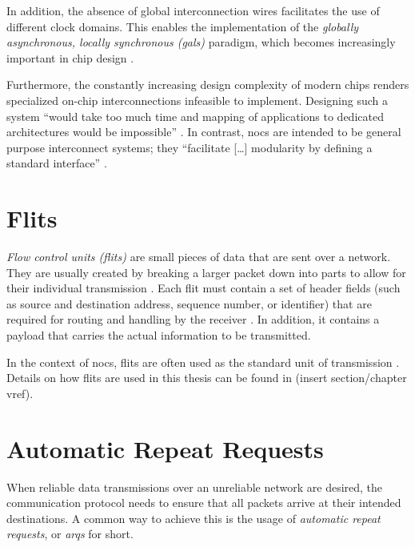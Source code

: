 In addition, the absence of global interconnection wires facilitates the use of different clock domains. This enables the implementation of the
\textit{globally asynchronous, locally synchronous (\gls{gals})} paradigm, which becomes increasingly important in chip design
\cites[3]{kumar02networkonchip}[2]{ivanov05nocintroduction}.

Furthermore, the constantly increasing design complexity of modern chips \cite{mack11mooreslaw} renders specialized on-chip
interconnections infeasible to implement. Designing such a system \enquote{would take too much time and mapping of applications to dedicated
architectures would be impossible} \cite[1]{kumar02networkonchip}. In contrast, \glspl{noc} are intended to be general purpose interconnect systems; they
\enquote{facilitate […] modularity by defining a standard interface} \cite[1]{dally01routepacketsnotwires}.


\section{Flits}\label{sec:flits}
\textit{Flow control units (flits)} are small pieces of data that are sent over a network. They are usually created by breaking a larger
packet down into parts to allow for their individual transmission \cite[6]{flitslecturecmu}. Each flit must contain a set of header fields (such as source and
destination address, sequence number, or identifier) that are required for routing and handling by the receiver \cite[2]{flitslectureutah}.
In addition, it contains a payload that carries the actual information to be transmitted.

In the context of \glspl{noc}, flits are often used as the standard unit of transmission \cite[51\psqq]{tatas16designingnocs}. Details on how flits
are used in this thesis can be found in (insert section/chapter vref).

\section{Automatic Repeat Requests}\label{sec:arqs}
When reliable data transmissions over an unreliable network are desired, the communication protocol needs to ensure that all packets arrive at their
intended destinations. A common way to achieve this is the usage of \textit{automatic repeat requests}, or \textit{\glspl{arq}} for short.

